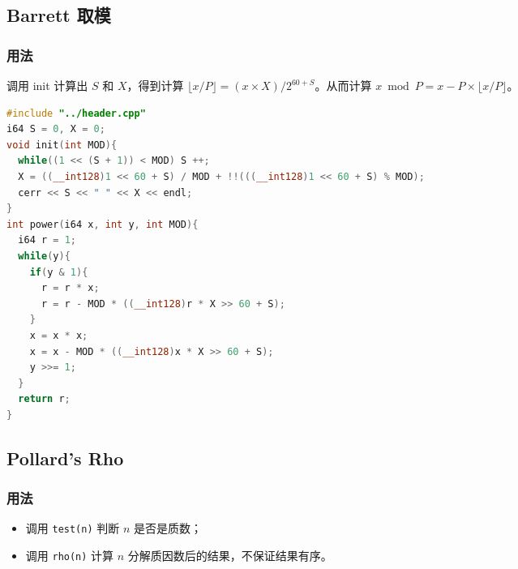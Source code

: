 \documentclass[10pt]{ctexart}
\providecommand{\tightlist}{\setlength{\itemsep}{0pt}\setlength{\parskip}{0pt}}
\newcommand{\passthrough}[1]{#1}
\begin{document}
\begin{multicols}{3}
    \subsection{Barrett 取模}\label{barrett-ux53d6ux6a21}

    \subsubsection{用法}\label{ux7528ux6cd5-8}

    调用 init 计算出 \(S\) 和 \(X\)，得到计算
    \(\lfloor x / P \rfloor = (x\times X) / 2^{60 + S}\)。从而计算
    \(x \bmod P = x - P \times \lfloor x / P \rfloor\)。

\begin{lstlisting}[language={C++}]
#include "../header.cpp"
i64 S = 0, X = 0;
void init(int MOD){
  while((1 << (S + 1)) < MOD) S ++;
  X = ((__int128)1 << 60 + S) / MOD + !!(((__int128)1 << 60 + S) % MOD);
  cerr << S << " " << X << endl;
}
int power(i64 x, int y, int MOD){
  i64 r = 1;
  while(y){
    if(y & 1){
      r = r * x;
      r = r - MOD * ((__int128)r * X >> 60 + S);
    }
    x = x * x;
    x = x - MOD * ((__int128)x * X >> 60 + S);
    y >>= 1;
  }
  return r;
}
\end{lstlisting}

    \subsection{Pollard's Rho}\label{pollards-rho}

    \subsubsection{用法}\label{ux7528ux6cd5-9}

    \begin{itemize}
    \tightlist
    \item
      调用 \passthrough{\lstinline!test(n)!} 判断 \(n\) 是否是质数；
    \item
      调用 \passthrough{\lstinline!rho(n)!} 计算 \(n\)
      分解质因数后的结果，不保证结果有序。
    \end{itemize}


\end{multicols}
\end{document}
